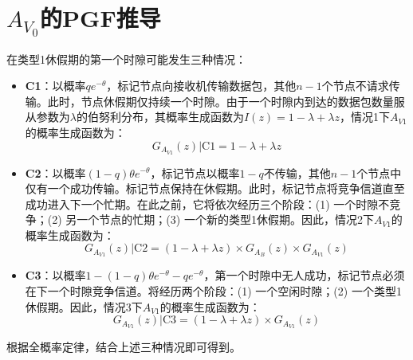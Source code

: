\section{$ A_{V_0}$的PGF推导 }
\label{app:proof_lemma1}

在类型1休假期的第一个时隙可能发生三种情况：

\begin{itemize}
	\item \textbf{C1}：以概率$qe^{-\theta}$，标记节点向接收机传输数据包，其他$n-1$个节点不请求传输。此时，节点休假期仅持续一个时隙。由于一个时隙内到达的数据包数量服从参数为$\lambda$的伯努利分布，其概率生成函数为$I(z) = 1 - \lambda + \lambda z$，情况1下$A_{V1}$的概率生成函数为：
	\begin{equation}
		G_{A_{V1}}(z)|\text{C1} = 1 - \lambda + \lambda z
	\end{equation}
	
	\item \textbf{C2}：以概率$(1-q)\theta e^{-\theta}$，标记节点以概率$1-q$不传输，其他$n-1$个节点中仅有一个成功传输。标记节点保持在休假期。此时，标记节点将竞争信道直至成功进入下一个忙期。在此之前，它将依次经历三个阶段：(1) 一个时隙不竞争；(2) 另一个节点的忙期；(3) 一个新的类型1休假期。因此，情况2下$A_{V1}$的概率生成函数为：
	\begin{equation}
		G_{A_{V1}}(z)|\text{C2} = (1 - \lambda + \lambda z) \times G_{A_{B}}(z) \times G_{A_{V1}}(z)
	\end{equation}
	
	\item \textbf{C3}：以概率$1 - (1-q)\theta e^{-\theta} - qe^{-\theta}$，第一个时隙中无人成功，标记节点必须在下一个时隙竞争信道。将经历两个阶段：(1) 一个空闲时隙；(2) 一个类型1休假期。因此，情况3下$A_{V1}$的概率生成函数为：
	\begin{equation}
		G_{A_{V1}}(z)|\text{C3} = (1 - \lambda + \lambda z) \times G_{A_{V1}}(z)
	\end{equation}
\end{itemize}

根据全概率定律，结合上述三种情况即可得到。
